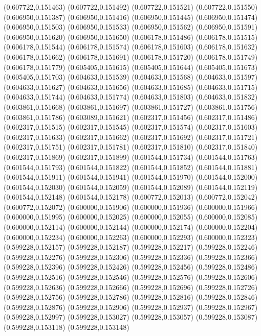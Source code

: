 (0.607722,0.151463)
(0.607722,0.151492)
(0.607722,0.151521)
(0.607722,0.151550)
(0.606950,0.151387)
(0.606950,0.151416)
(0.606950,0.151445)
(0.606950,0.151474)
(0.606950,0.151503)
(0.606950,0.151533)
(0.606950,0.151562)
(0.606950,0.151591)
(0.606950,0.151620)
(0.606950,0.151650)
(0.606178,0.151486)
(0.606178,0.151515)
(0.606178,0.151544)
(0.606178,0.151574)
(0.606178,0.151603)
(0.606178,0.151632)
(0.606178,0.151662)
(0.606178,0.151691)
(0.606178,0.151720)
(0.606178,0.151749)
(0.606178,0.151779)
(0.605405,0.151615)
(0.605405,0.151644)
(0.605405,0.151673)
(0.605405,0.151703)
(0.604633,0.151539)
(0.604633,0.151568)
(0.604633,0.151597)
(0.604633,0.151627)
(0.604633,0.151656)
(0.604633,0.151685)
(0.604633,0.151715)
(0.604633,0.151744)
(0.604633,0.151774)
(0.604633,0.151803)
(0.604633,0.151832)
(0.603861,0.151668)
(0.603861,0.151697)
(0.603861,0.151727)
(0.603861,0.151756)
(0.603861,0.151786)
(0.603089,0.151621)
(0.602317,0.151456)
(0.602317,0.151486)
(0.602317,0.151515)
(0.602317,0.151545)
(0.602317,0.151574)
(0.602317,0.151603)
(0.602317,0.151633)
(0.602317,0.151662)
(0.602317,0.151692)
(0.602317,0.151721)
(0.602317,0.151751)
(0.602317,0.151781)
(0.602317,0.151810)
(0.602317,0.151840)
(0.602317,0.151869)
(0.602317,0.151899)
(0.601544,0.151734)
(0.601544,0.151763)
(0.601544,0.151793)
(0.601544,0.151822)
(0.601544,0.151852)
(0.601544,0.151881)
(0.601544,0.151911)
(0.601544,0.151941)
(0.601544,0.151970)
(0.601544,0.152000)
(0.601544,0.152030)
(0.601544,0.152059)
(0.601544,0.152089)
(0.601544,0.152119)
(0.601544,0.152148)
(0.601544,0.152178)
(0.600772,0.152013)
(0.600772,0.152042)
(0.600772,0.152072)
(0.600000,0.151906)
(0.600000,0.151936)
(0.600000,0.151966)
(0.600000,0.151995)
(0.600000,0.152025)
(0.600000,0.152055)
(0.600000,0.152085)
(0.600000,0.152114)
(0.600000,0.152144)
(0.600000,0.152174)
(0.600000,0.152204)
(0.600000,0.152234)
(0.600000,0.152263)
(0.600000,0.152293)
(0.600000,0.152323)
(0.599228,0.152157)
(0.599228,0.152187)
(0.599228,0.152217)
(0.599228,0.152246)
(0.599228,0.152276)
(0.599228,0.152306)
(0.599228,0.152336)
(0.599228,0.152366)
(0.599228,0.152396)
(0.599228,0.152426)
(0.599228,0.152456)
(0.599228,0.152486)
(0.599228,0.152516)
(0.599228,0.152546)
(0.599228,0.152576)
(0.599228,0.152606)
(0.599228,0.152636)
(0.599228,0.152666)
(0.599228,0.152696)
(0.599228,0.152726)
(0.599228,0.152756)
(0.599228,0.152786)
(0.599228,0.152816)
(0.599228,0.152846)
(0.599228,0.152876)
(0.599228,0.152906)
(0.599228,0.152937)
(0.599228,0.152967)
(0.599228,0.152997)
(0.599228,0.153027)
(0.599228,0.153057)
(0.599228,0.153087)
(0.599228,0.153118)
(0.599228,0.153148)

